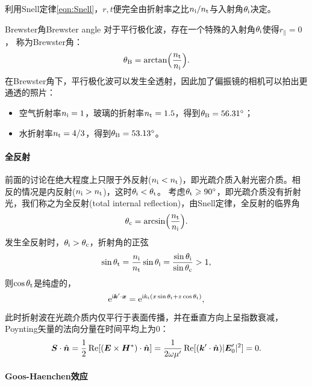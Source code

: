 利用Snell定律\eqref{eqn:Snell}，$r,t$便完全由折射率之比$n_{\mathrm{i}}/n_\text t$与入射角$\theta_{\mathrm{i}}$决定。

\begin{example}
    {Brewster角}{Brewster angle}
    对于平行极化波，存在一个特殊的入射角$\theta_{\mathrm{i}}$使得$r_\parallel=0$，%
    称为Brewster角：
    \begin{equation}
        \label{eqn:Brewster}
        \theta_\text B=\arctan\Bigl(\frac{n_\text t}{n_{\mathrm{i}}}\Bigr).
    \end{equation}
    在Brewster角下，平行极化波可以发生全透射，因此加了偏振镜的相机可以拍出更通透的照片：
    \begin{itemize}
        \item 空气折射率$n_{\mathrm{i}}=1$，玻璃的折射率$n_\text t=1.5$，得到$\theta_\text B=56.31^\circ$；
        \item 水折射率$n_\text t=4/3$，得到$\theta_\text B=53.13^\circ$。
    \end{itemize}
    
\end{example}

\paragraph{全反射}

前面的讨论在绝大程度上只限于外反射($n_{\mathrm{i}}<n_\text t$)，即光疏介质入射光密介质。相反的情况是内反射($n_{\mathrm{i}}>n_\text t$)，这时$\theta_{\mathrm{i}}<\theta_\text t$。
考虑$\theta_\text t\geqslant90^\circ$，即光疏介质没有折射光，我们称之为全反射(total internal reflection)，由Snell定律，全反射的临界角
\begin{equation}
    \label{eqn:total reflect}
    \theta_\text c=\arcsin\Bigl(\frac{n_\text t}{n_{\mathrm{i}}}\Bigr).
\end{equation}
发生全反射时，$\theta_{\mathrm{i}}>\theta_\text c$，折射角的正弦
\[
    \sin\theta_\text t=\frac{n_{\mathrm{i}}}{n_\text t}\sin\theta_{\mathrm{i}}=\frac{\sin\theta_{\mathrm{i}}}{\sin\theta_\text c}>1,
\]
则$\cos\theta_\text t$是纯虚的，
\[
    \mathop{}\!\mathrm{e}^{\mathrm{i}\bm k'\cdot\bm x}=\mathop{}\!\mathrm{e}^{\mathrm{i} k_\text t(x\sin\theta_\text t+z\cos\theta_\text t)},
\]
此时折射波在光疏介质内仅平行于表面传播，并在垂直方向上呈指数衰减，Poynting矢量的法向分量在时间平均上为0：
\[
    \bm S\cdot\mathop{}\!\hat{\bm{n}}=\frac12\operatorname{Re}[(\bm E\times\bm H^\ast)\cdot\mathop{}\!\hat{\bm{n}}]=\frac1{2\omega\mu'}\operatorname{Re}[(\bm k'\cdot\mathop{}\!\hat{\bm{n}})|\bm E'_0|^2]=0.
\]

\paragraph{Goos-Haenchen效应}

